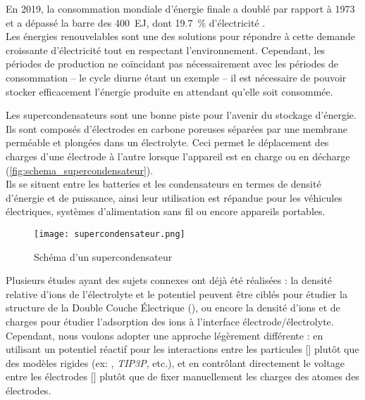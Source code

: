 En 2019, la consommation mondiale d'énergie finale a doublé par rapport à 1973 et a dépassé la barre des \qty{400}{\exa \joule}, dont \qty{19.7}{\percent} d'électricité \cite{birol_key_nodate}.\\
Les énergies renouvelables sont une des solutions pour répondre à cette demande croissante d'électricité tout en respectant l'environnement. Cependant, les périodes de production ne coïncidant pas nécessairement avec les périodes de consommation -- le cycle diurne étant un exemple -- il est nécessaire de pouvoir stocker efficacement l'énergie produite en attendant qu'elle soit consommée.

Les supercondensateurs sont une bonne piste pour l'avenir du stockage d'énergie. Ils sont composés d'électrodes en carbone poreuses séparées par une membrane perméable et plongées dans un électrolyte. Ceci permet le déplacement des charges d'une électrode à l'autre lorsque l'appareil est en charge ou en décharge (\autoref{fig:schema_supercondensateur}).\\
Ils se situent entre les batteries et les condensateurs en termes de densité d'énergie et de puissance, ainsi leur utilisation est répandue pour les véhicules électriques, systèmes d'alimentation sans fil ou encore appareils portables.

\begin{figure}[h!]
    \centering
    \texttt{[image: supercondensateur.png]}
    \caption{Schéma d'un supercondensateur}
    \label{fig:schema_supercondensateur}
\end{figure}

Plusieurs études ayant des sujets connexes ont déjà été réalisées : la densité relative d'ions de l'électrolyte et le potentiel peuvent être ciblés pour étudier la structure de la Double Couche Électrique (\edl{})\cite{jiang_molecular_2016}, ou encore la densité d'ions et de charges pour étudier l'adsorption des ions à l'interface électrode/électrolyte\cite{cole_ion_2011}. Cependant, nous voulons adopter une approche légèrement différente : en utilisant un potentiel réactif pour les interactions entre les particules [\reaxff{}] plutôt que des modèles rigides (ex: \spce{}, \emph{TIP3P}, etc.), et en contrôlant directement le voltage entre les électrodes [\echemdid{}] plutôt que de fixer manuellement les charges des atomes des électrodes.

